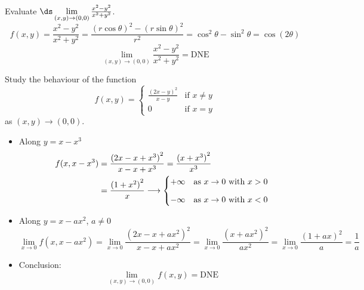\begin{eg}\label{ex LIMtwodC}
Evaluate $\ds\lim\limits_{(x,y)\rightarrow (0,0)}\frac{x^2-y^2}{x^2+y^2}$.
\soln
$$f(x,y)=\frac{x^2-y^2}{x^2+y^2}=\frac{(r\cos\theta)^2-(r\sin\theta)^2}{r^2}
=\cos^2\theta-\sin^2\theta
=\cos(2\theta)$$
$$\lim\limits_{(x,y)\rightarrow (0,0)}\frac{x^2-y^2}{x^2+y^2} = \text{DNE}$$
\end{eg}
\begin{eg}\label{eg nasty limit}
Study the behaviour of the function
$$f(x,y) =
\begin{cases}
\frac{(2x-y)^2}{x-y} & \text{if $x\ne y$}\\[0.05in]
0 & \text{if $x=y$}
\end{cases}$$
as $(x,y)\rightarrow (0,0)$.
\soln
\begin{itemize}
\item Along $y = x - x^3$
\begin{align*}
f(x,x-x^3)&=\frac{{(2x-x+x^3)}^2}{x-x+x^3}
=\frac{{(x+x^3)}^2}{x^3} \\
&=\frac{{(1+x^2)}^2}{x}\longrightarrow
\begin{cases}+\infty & \text{as $x\rightarrow 0$ with $x>0$}\\
\noalign{\vskip0.1in}
-\infty & \text{as $x\rightarrow 0$ with $x<0$}
\end{cases}
\end{align*}
\item Along $y = x - ax^2$, $a\not=0$
$$
\lim_{x\rightarrow 0}f(x,x-ax^2)
=\lim_{x\rightarrow 0}\frac{{(2x-x+ax^2)}^2}{x-x+ax^2}
=\lim_{x\rightarrow 0}\frac{{(x+ax^2)}^2}{ax^2}
=\lim_{x\rightarrow 0}\frac{{(1+ax)}^2}{a}
=\frac{1}{a}
$$
\item Conclusion:
$$\lim\limits_{(x,y)\rightarrow (0,0)}f(x, y) = \text{DNE}$$
\end{itemize}
\end{eg}
